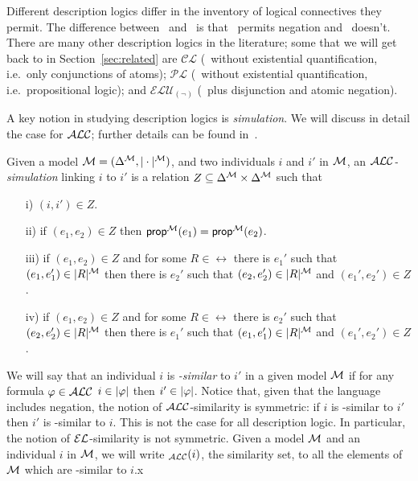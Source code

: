 Different description logics differ in the inventory of logical
connectives they permit.  The difference between \alc\ and \el\ is
that \alc\ permits negation and \el\ doesn't.  There are many other
description logics in the literature; some that we will get back to in
Section~\ref{sec:related} are $\mathcal{CL}$ (\el\ without existential
quantification, i.e.\ only conjunctions of atoms); $\mathcal{PL}$
(\alc\ without existential quantification, i.e.\ propositional logic);
and $\mathcal{ELU}_{(\neg)}$ (\el\ plus disjunction and atomic
negation).

A key notion in studying description logics is \emph{simulation}.
We will discuss in detail the case for $\mathcal{ALC}$; further details can be
found in~\cite{blac:moda01,kurt:expr99}.

\begin{definition}
Given a model $\mathcal{M} = (\Delta^{\mathcal{M}},|\cdot|^{\mathcal{M}})$, and two individuals $i$ and $i'$ in $\mathcal{M}$, an \emph{$\mathcal{ALC}$-simulation} linking $i$ to $i'$  is a relation $Z
\subseteq \Delta^{\mathcal{M}} \times \Delta^{\mathcal{M}}$ such that 
\begin{itemize}
\item[i)] $(i,i') \in Z$.\\[-1.5em]
\item[ii)] if $(e_1, e_2) \in Z$ then $\textsf{prop}^{\mathcal{M}}(e_1) = \textsf{prop}^{\mathcal{M}}(e_2)$.\\[-1.5em]
\item[iii)] if $(e_1,e_2) \in Z$ and for some $R \in \rel$ there is $e_1'$ such that
$(e_1,e_1') \in |R|^{\mathcal{M}}$ then there is $e_2'$ such that $(e_2,e_2') \in |R|^{\mathcal{M}}$ and
$(e_1',e_2') \in Z$.\\[-1.5em]
\item[iv)] if $(e_1,e_2) \in Z$ and for some $R \in \rel$ there is $e_2'$ such that
$(e_2,e_2') \in |R|^{\mathcal{M}}$ then there is $e_1'$ such that $(e_1,e_1') \in |R|^{\mathcal{M}}$ and
$(e_1',e_2') \in Z$.
\end{itemize}
\end{definition}

We will say that an individual $i$ is \emph{\alc-similar} to $i'$
in a given model $\mathcal{M}$ if for any formula $\varphi \in \mathcal{ALC}$ $i \in |\varphi|$ then
$i' \in |\varphi|$.  Notice that, given that the language includes negation,
the notion of $\mathcal{ALC}$-similarity is symmetric: if $i$ is \alc-similar to $i'$ then
$i'$ is \alc-similar to $i$.  This is not the case for all description
logic.  In particular, the notion of $\mathcal{EL}$-similarity is not symmetric.
Given a model $\mathcal{M}$ and an individual $i$ in $\mathcal{M}$, we will write \simm$_\mathcal{ALC}(i)$, the similarity set, to all the elements of $\mathcal{M}$ which are \alc-similar to $i$.x

